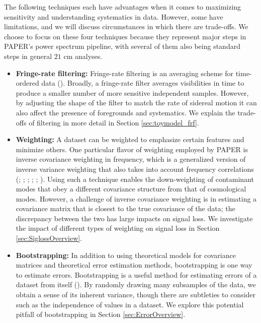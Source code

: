 \documentclass[preprint2,numberedappendix,tighten]{aastex6}  %
\begin{document}
The following techniques each have advantages when it comes to maximizing sensitivity and understanding systematics in 
data. However, some have limitations, and we will discuss circumstances in which there are trade-offs. We choose to focus on 
these four techniques because they represent major steps in PAPER's power spectrum pipeline, with several of them also 
being standard steps in general $21$ cm analyses.
\begin{itemize}
\item \textbf{Fringe-rate filtering:} Fringe-rate filtering is an averaging scheme for time-ordered data 
(\citealt{parsons_et_al2016}). Broadly, a fringe-rate filter averages visibilities in time to produce a smaller number of more sensitive 
independent samples. However, by adjusting the shape of the filter to match the rate of sidereal motion it can also affect the presence 
of foregrounds and systematics. We explain the trade-offs of filtering in more detail in Section \ref{sec:toymodel_frf}.
\item \textbf{Weighting:} A dataset can be weighted to emphasize certain features and minimize others. One particular flavor of 
weighting employed by PAPER is inverse covariance weighting in frequency, which is a generalized version of inverse variance 
weighting that also takes into account frequency correlations (\citealt{liu_tegmark2011}; \citealt{dillon_et_al2013a}; \citealt{liu_et_al2014a}; \citealt{liu_et_al2014b}; \citealt{dillon_et_al2014}; \citealt{dillon_et_al2015}). Using such a technique enables the down-weighting of contaminant modes that obey a different covariance structure from that of cosmological modes. However, a challenge of inverse covariance 
weighting is in estimating a covariance matrix that is closest to the true covariance of the data; the discrepancy between the two has large impacts on signal loss. We investigate the impact of different types of weighting on signal loss in Section \ref{sec:SiglossOverview}.
\item \textbf{Bootstrapping:} In addition to using theoretical models for covariance matrices and theoretical error estimation 
methods, bootstrapping is one way to estimate errors. Bootstrapping is a useful method for estimating errors of a dataset from 
itself (\citealt{andrae2010}). By randomly drawing many subsamples of the data, we obtain a sense of its inherent variance, though there are subtleties to 
consider such as the independence of values in a dataset. We explore this potential pitfall of bootstrapping in Section \ref{sec:ErrorOverview}.

\end{itemize}
\end{document}

